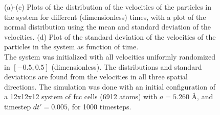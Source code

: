 \begin{figure}
\begin{center}
{{      }
  }
  \parbox{5in} {
      \caption {
          \small {
              (a)-(c) Plots of the distribution of the velocities of the particles in the system for different (dimensionless) times, with a plot of the normal distribution using the mean and standard deviation of the velocities. (d) Plot of the standard deviation of the velocities of the particles in the system as function of time. \\ The system was initialized with all velocities uniformly randomized in $[-0.5,0.5]$ (dimensionless). The distributions and standard deviations are found from the velocities in all three spatial directions. The simulation was done with an initial configuration of a 12x12x12 system of fcc cells (6912 atoms) with $a = 5.260$ \AA, and timestep $dt' = 0.005$, for 1000 timesteps.
          }
          \label{fig:velocity_distribution}
      }
  }
  \end{center}
\end{figure}

